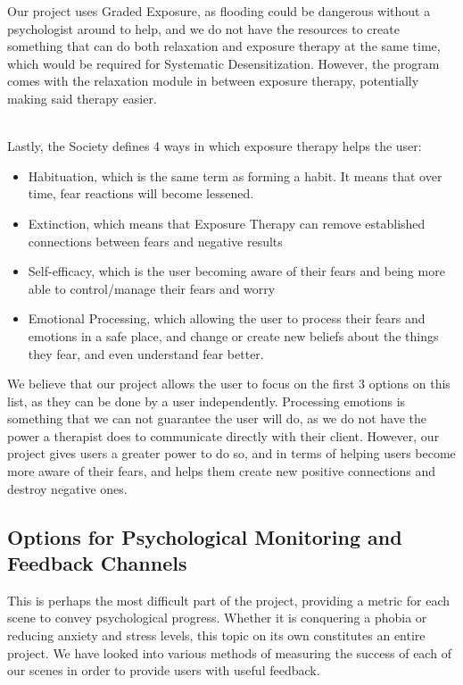 \documentclass[a4paper,10pt]{article}
\begin{document}
Our project uses Graded Exposure, as flooding could be dangerous without a psychologist around to help, and we do not have the resources to create something that can do
both relaxation and exposure therapy at the same time, which would be required for Systematic Desensitization. However, the program comes with the relaxation
module in between exposure therapy, potentially making said therapy easier.
\par~\\ 
Lastly, the Society defines 4 ways in which exposure therapy helps the user:
\begin{itemize}
	\item Habituation, which is the same term as forming a habit.  It means that over time, fear reactions will become lessened.
	\item Extinction, which means that Exposure Therapy can remove established connections between fears and negative results
	\item Self-efficacy, which is the user becoming aware of their fears and being more able to control/manage their fears and worry
	\item Emotional Processing, which allowing the user to process their fears and emotions in a safe place, and change or create new beliefs about the things they fear, 
	and even understand fear better.
\end{itemize}

We believe that our project allows the user to focus on the first 3 options on this list, as they can be done by a user independently.  Processing emotions is something that we can not guarantee 
the user will do, as we do not have the power a therapist does to communicate directly with their client.  However, our project gives users a greater power to do so, and in terms 
of helping users become more aware of their fears, and helps them create new positive connections and destroy negative ones. \cite{exposeTherapy}


\pagebreak

\pagebreak
\subsection{Options for Psychological Monitoring and Feedback Channels}
This is perhaps the most difficult part of the project, providing a metric for each scene to convey psychological progress. Whether it is conquering a phobia or
reducing anxiety and stress levels, this topic on its own constitutes an entire project. We have looked into various methods of measuring the success of each of our
scenes in order to provide users with useful feedback.
\end{document}
